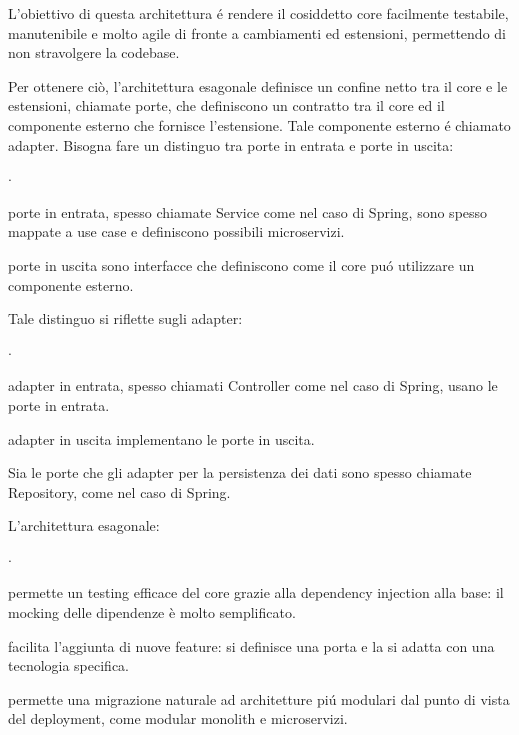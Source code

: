 L’obiettivo di questa architettura é rendere il cosiddetto core facilmente testabile, 
manutenibile e molto agile di fronte a cambiamenti ed estensioni, permettendo di non 
stravolgere la codebase.

Per ottenere ciò, l’architettura esagonale definisce un confine netto tra il core e 
le estensioni, chiamate porte, che definiscono un contratto tra il core ed il componente 
esterno che fornisce l’estensione. Tale componente esterno é chiamato adapter.
Bisogna fare un distinguo tra porte in entrata e porte in uscita:
\begin{list}{$\cdot$}{}
    \item porte in entrata, spesso chiamate Service come nel caso di Spring, sono spesso 
    mappate a use case e definiscono possibili microservizi.
    \item porte in uscita sono interfacce che definiscono come il core puó utilizzare 
    un componente esterno.
\end{list}

Tale distinguo si riflette sugli adapter:
\begin{list}{$\cdot$}{}
    \item adapter in entrata, spesso chiamati Controller come nel caso di Spring, 
    usano le porte in entrata.
    \item adapter in uscita implementano le porte in uscita.
\end{list}

Sia le porte che gli adapter per la persistenza dei dati sono spesso chiamate Repository, 
come nel caso di Spring.

L’architettura esagonale: 
\begin{list}{$\cdot$}{}
    \item permette un testing efficace del core grazie alla dependency injection 
    alla base: il mocking delle dipendenze è molto semplificato.
    \item facilita l’aggiunta di nuove feature: si definisce una porta e la si 
    adatta con una tecnologia specifica.
    \item permette una migrazione naturale ad architetture piú modulari dal punto 
    di vista del deployment, come modular monolith e microservizi.
\end{list}

